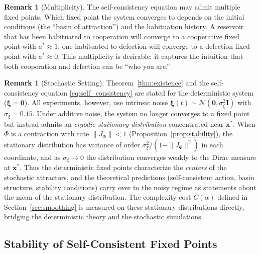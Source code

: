 \documentclass[11pt,a4paper]{article}
\theoremstyle{definition}
\newtheorem{remark}[theorem]{Remark}
\newcommand{\xstate}{\mathbf{x}}
\begin{document}
\begin{remark}[Multiplicity]
The self-consistency equation may admit multiple fixed points.
Which fixed point the system converges to depends on the initial conditions
(the ``basin of attraction'') and the habituation history.  A reservoir
that has been habituated to cooperation will converge to a cooperative
fixed point with $a^{*} \approx 1$; one habituated to defection will
converge to a defection fixed point with $a^{*} \approx 0$.
This multiplicity is desirable: it captures the intuition that
both cooperation and defection can be ``who you are.''
\end{remark}

\begin{remark}[Stochastic Setting]
\label{rem:stochastic}
Theorem~\ref{thm:existence} and the self-consistency equation
\eqref{eq:self_consistency} are stated for the deterministic system
($\boldsymbol{\xi} = \mathbf{0}$).  All experiments, however, use
intrinsic noise $\boldsymbol{\xi}(t) \sim \mathcal{N}(\mathbf{0},
\sigma_\xi^2 \mathbf{I})$ with $\sigma_\xi = 0.15$.
Under additive noise, the system no longer converges to a fixed point
but instead admits an \emph{ergodic stationary distribution}
concentrated near $\xstate^{*}$.
When $\Phi$ is a contraction with rate $\|J_\Phi\| < 1$
(Proposition~\ref{prop:stability}), the stationary distribution has
variance of order $\sigma_\xi^2 / (1 - \|J_\Phi\|^2)$ in each
coordinate, and as $\sigma_\xi \to 0$ the distribution converges
weakly to the Dirac measure at $\xstate^{*}$.
Thus the deterministic fixed points characterize the
\emph{centers} of the stochastic attractors, and the theoretical
predictions (self-consistent action, basin structure, stability
conditions) carry over to the noisy regime as statements about
the mean of the stationary distribution.
The complexity cost $C(\alpha)$ defined in
Section~\ref{sec:smoothing} is measured on these stationary
distributions directly, bridging the deterministic theory and
the stochastic simulations.
\end{remark}

\subsection{Stability of Self-Consistent Fixed Points}
\end{document}
